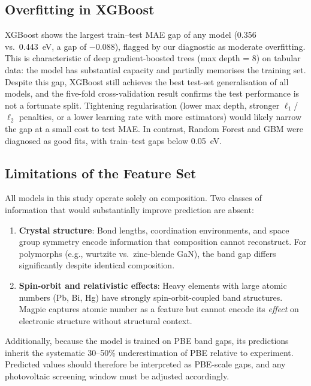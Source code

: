 \documentclass[conference]{IEEEtran}
\begin{document}
\subsection{Overfitting in XGBoost}

XGBoost shows the largest train--test MAE gap of any model (0.356 vs.\ 0.443~eV, a gap of $-0.088$), flagged by our diagnostic as moderate overfitting. This is characteristic of deep gradient-boosted trees (max depth = 8) on tabular data: the model has substantial capacity and partially memorises the training set. Despite this gap, XGBoost still achieves the best test-set generalisation of all models, and the five-fold cross-validation result confirms the test performance is not a fortunate split. Tightening regularisation (lower max depth, stronger $\ell_1$/$\ell_2$ penalties, or a lower learning rate with more estimators) would likely narrow the gap at a small cost to test MAE. In contrast, Random Forest and GBM were diagnosed as good fits, with train--test gaps below 0.05~eV.

\subsection{Limitations of the Feature Set}

All models in this study operate solely on composition. Two classes of information that would substantially improve prediction are absent:

\begin{enumerate}
  \item \textbf{Crystal structure}: Bond lengths, coordination environments, and space group symmetry encode information that composition cannot reconstruct. For polymorphs (e.g., wurtzite vs.\ zinc-blende GaN), the band gap differs significantly despite identical composition.
  \item \textbf{Spin-orbit and relativistic effects}: Heavy elements with large atomic numbers (Pb, Bi, Hg) have strongly spin-orbit-coupled band structures. Magpie captures atomic number as a feature but cannot encode its \emph{effect} on electronic structure without structural context.
\end{enumerate}

Additionally, because the model is trained on PBE band gaps, its predictions inherit the systematic 30--50\% underestimation of PBE relative to experiment. Predicted values should therefore be interpreted as PBE-scale gaps, and any photovoltaic screening window must be adjusted accordingly.
\end{document}

